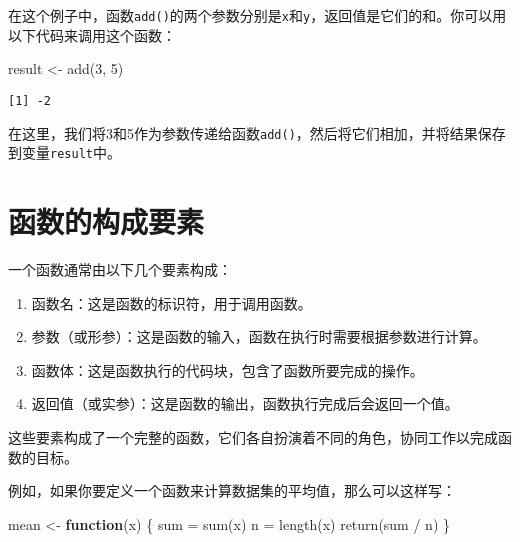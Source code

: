\documentclass[
  letterpaper,
  DIV=11,
  numbers=noendperiod]{scrreprt}
\newenvironment{Shaded}{\begin{snugshade}}{\end{snugshade}}
\newcommand{\ControlFlowTok}[1]{\textcolor[rgb]{0.00,0.23,0.31}{\textbf{#1}}}
\newcommand{\DecValTok}[1]{\textcolor[rgb]{0.68,0.00,0.00}{#1}}
\newcommand{\FunctionTok}[1]{\textcolor[rgb]{0.28,0.35,0.67}{#1}}
\newcommand{\NormalTok}[1]{\textcolor[rgb]{0.00,0.23,0.31}{#1}}
\newcommand{\OtherTok}[1]{\textcolor[rgb]{0.00,0.23,0.31}{#1}}
\newcommand{\SpecialCharTok}[1]{\textcolor[rgb]{0.37,0.37,0.37}{#1}}
\begin{document}
在这个例子中，函数\texttt{add()}的两个参数分别是\texttt{x}和\texttt{y}，返回值是它们的和。你可以用以下代码来调用这个函数：

\begin{Shaded}
\begin{Highlighting}[]
\NormalTok{result }\OtherTok{\textless{}{-}} \FunctionTok{add}\NormalTok{(}\DecValTok{3}\NormalTok{, }\DecValTok{5}\NormalTok{)}
\end{Highlighting}
\end{Shaded}

\begin{verbatim}
[1] -2
\end{verbatim}

在这里，我们将3和5作为参数传递给函数\texttt{add()}，然后将它们相加，并将结果保存到变量\texttt{result}中。

\section{函数的构成要素}\label{ux51fdux6570ux7684ux6784ux6210ux8981ux7d20}

一个函数通常由以下几个要素构成：

\begin{enumerate}
\def\labelenumi{\arabic{enumi}.}
\item
  函数名：这是函数的标识符，用于调用函数。
\item
  参数（或形参）：这是函数的输入，函数在执行时需要根据参数进行计算。
\item
  函数体：这是函数执行的代码块，包含了函数所要完成的操作。
\item
  返回值（或实参）：这是函数的输出，函数执行完成后会返回一个值。
\end{enumerate}

这些要素构成了一个完整的函数，它们各自扮演着不同的角色，协同工作以完成函数的目标。

例如，如果你要定义一个函数来计算数据集的平均值，那么可以这样写：

\begin{Shaded}
\begin{Highlighting}[]
\NormalTok{mean }\OtherTok{\textless{}{-}} \ControlFlowTok{function}\NormalTok{(x) \{}
\NormalTok{  sum }\OtherTok{=} \FunctionTok{sum}\NormalTok{(x)}
\NormalTok{  n }\OtherTok{=} \FunctionTok{length}\NormalTok{(x)}
  \FunctionTok{return}\NormalTok{(sum }\SpecialCharTok{/}\NormalTok{ n)}
\NormalTok{\}}
\end{Highlighting}
\end{Shaded}
\end{document}
